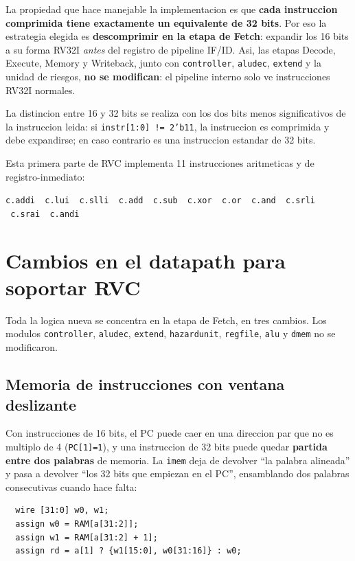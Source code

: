 \documentclass[11pt,a4paper]{article}
\begin{document}
La propiedad que hace manejable la implementacion es que \textbf{cada instruccion
comprimida tiene exactamente un equivalente de 32 bits}. Por eso la estrategia
elegida es \textbf{descomprimir en la etapa de Fetch}: expandir los 16 bits a su
forma RV32I \emph{antes} del registro de pipeline IF/ID. Asi, las etapas Decode,
Execute, Memory y Writeback, junto con \texttt{controller}, \texttt{aludec},
\texttt{extend} y la unidad de riesgos, \textbf{no se modifican}: el pipeline
interno solo ve instrucciones RV32I normales.

La distincion entre 16 y 32 bits se realiza con los dos bits menos significativos
de la instruccion leida: si \texttt{instr[1:0] != 2'b11}, la instruccion es
comprimida y debe expandirse; en caso contrario es una instruccion estandar de 32
bits.

Esta primera parte de RVC implementa 11 instrucciones aritmeticas y de
registro-inmediato:
\begin{center}
\texttt{c.addi \ c.lui \ c.slli \ c.add \ c.sub \ c.xor \ c.or \ c.and \ c.srli \ c.srai \ c.andi}
\end{center}

\section{Cambios en el datapath para soportar RVC}

Toda la logica nueva se concentra en la etapa de Fetch, en tres cambios. Los
modulos \texttt{controller}, \texttt{aludec}, \texttt{extend},
\texttt{hazardunit}, \texttt{regfile}, \texttt{alu} y \texttt{dmem} no se
modificaron.

\subsection{Memoria de instrucciones con ventana deslizante}

Con instrucciones de 16 bits, el PC puede caer en una direccion par que no es
multiplo de 4 (\texttt{PC[1]=1}), y una instruccion de 32 bits puede quedar
\textbf{partida entre dos palabras} de memoria. La \texttt{imem} deja de devolver
``la palabra alineada'' y pasa a devolver ``los 32 bits que empiezan en el PC'',
ensamblando dos palabras consecutivas cuando hace falta:

\begin{lstlisting}
  wire [31:0] w0, w1;
  assign w0 = RAM[a[31:2]];
  assign w1 = RAM[a[31:2] + 1];
  assign rd = a[1] ? {w1[15:0], w0[31:16]} : w0;
\end{lstlisting}
\end{document}
